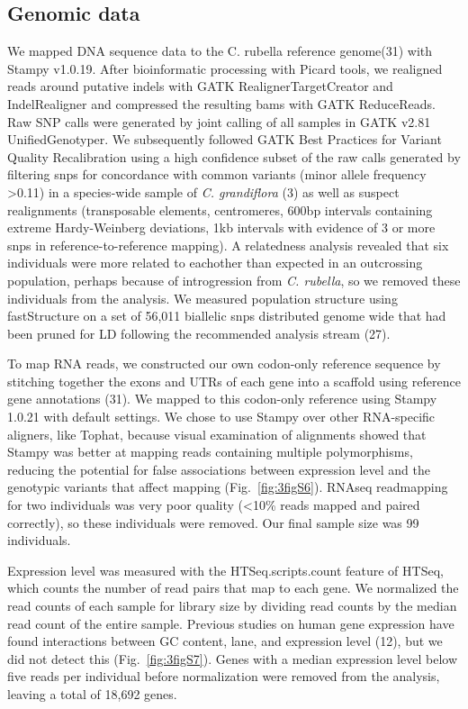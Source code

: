 \subsection{Genomic data}
We mapped DNA sequence data to the C. rubella reference genome(31) with Stampy v1.0.19. After bioinformatic processing with Picard tools, we realigned reads around putative indels with GATK RealignerTargetCreator and IndelRealigner and compressed the resulting bams with GATK ReduceReads. Raw SNP calls were generated by joint calling of all samples in GATK v2.81 UnifiedGenotyper. We subsequently followed GATK Best Practices for Variant Quality Recalibration using a high confidence subset of the  raw calls generated by filtering snps for concordance with common variants (minor allele frequency \textgreater 0.11) in a species-wide sample of \textit{C. grandiflora} (3) as well as suspect realignments (transposable elements, centromeres, 600bp intervals containing extreme Hardy-Weinberg deviations, 1kb intervals with evidence of 3 or more snps in reference-to-reference mapping). A relatedness analysis revealed that six individuals were more related to eachother than expected in an outcrossing population, perhaps because of introgression from \textit{C. rubella}, so we removed these individuals from the analysis. We measured population structure using fastStructure on a set of 56,011 biallelic snps distributed genome wide that had been pruned for LD following the recommended analysis stream (27).

To map RNA reads, we constructed our own codon-only reference sequence by stitching together the exons and UTRs of each gene into a scaffold using reference gene annotations (31). We mapped to this codon-only reference using Stampy 1.0.21 with default settings. We chose to use Stampy over other RNA-specific aligners, like Tophat, because visual examination of alignments showed that Stampy was better at mapping reads containing multiple polymorphisms, reducing the potential for false associations between expression level and the genotypic variants that affect mapping (Fig.~\ref{fig:3figS6}). RNAseq readmapping for two individuals was very poor quality (\textless10\% reads mapped and paired correctly), so these individuals were removed. Our final sample size was 99 individuals.

Expression level was measured with the HTSeq.scripts.count feature of HTSeq, which counts the number of read pairs that map to each gene. We normalized the read counts of each sample for library size by dividing read counts by the median read count of the entire sample. Previous studies on human gene expression have found interactions between GC content, lane, and expression level (12), but we did not detect this (Fig.~\ref{fig:3figS7}). Genes with a median expression level below five reads per individual before normalization were removed from the analysis, leaving a total of 18,692 genes.

